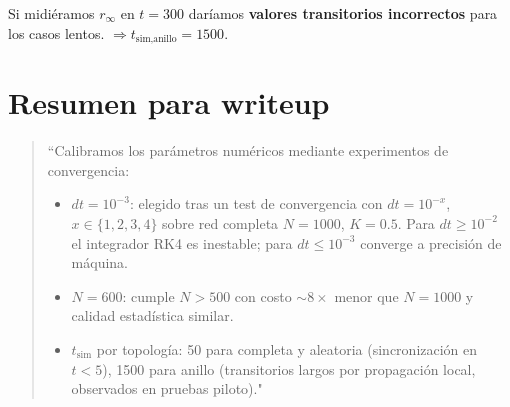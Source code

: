 \documentclass[11pt,a4paper]{article}
\begin{document}
Si midiéramos $r_\infty$ en $t=300$ daríamos \textbf{valores transitorios incorrectos} para los casos lentos. $\Rightarrow t_{\text{sim,anillo}} = 1500$.

\section{Resumen para writeup}

\begin{quote}
\small
``Calibramos los parámetros numéricos mediante experimentos de convergencia:
\begin{itemize}
\item $dt = 10^{-3}$: elegido tras un test de convergencia con $dt = 10^{-x}$, $x \in \{1,2,3,4\}$ sobre red completa $N=1000$, $K=0.5$. Para $dt \geq 10^{-2}$ el integrador RK4 es inestable; para $dt \leq 10^{-3}$ converge a precisión de máquina.
\item $N = 600$: cumple $N>500$ con costo $\sim 8\times$ menor que $N=1000$ y calidad estadística similar.
\item $t_{\text{sim}}$ por topología: 50 para completa y aleatoria (sincronización en $t<5$), 1500 para anillo (transitorios largos por propagación local, observados en pruebas piloto)."
\end{itemize}
\end{quote}
\end{document}
